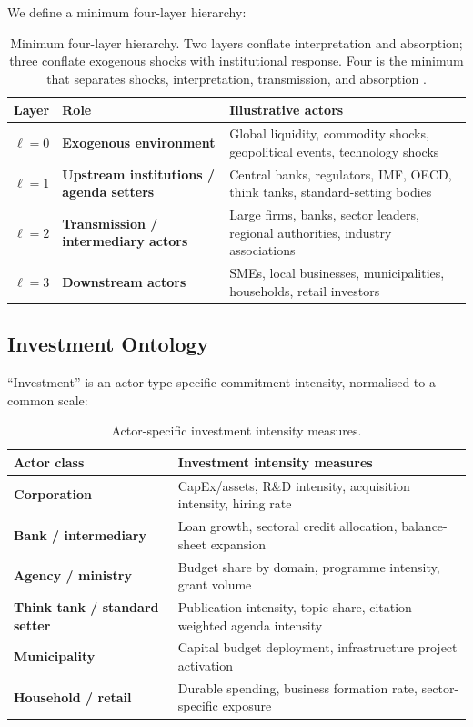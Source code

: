 \documentclass[11pt,a4paper]{article}
\theoremstyle{definition}
\begin{document}
We define a minimum four-layer hierarchy:
\begin{table}[H]
\centering\small
\begin{tabularx}{\textwidth}{@{}>{\bfseries}p{}>{\bfseries}p{}X@{}}
\toprule
Layer & Role & Illustrative actors \\
\midrule
$\ell=0$ & Exogenous environment & Global liquidity, commodity shocks, geopolitical events, technology shocks \\
$\ell=1$ & Upstream institutions / agenda setters & Central banks, regulators, IMF, OECD, think tanks, standard-setting bodies \\
$\ell=2$ & Transmission / intermediary actors & Large firms, banks, sector leaders, regional authorities, industry associations \\
$\ell=3$ & Downstream actors & SMEs, local businesses, municipalities, households, retail investors \\
\bottomrule
\end{tabularx}
\caption{Minimum four-layer hierarchy. Two layers conflate interpretation and absorption; three conflate exogenous shocks with institutional response. Four is the minimum that separates shocks, interpretation, transmission, and absorption \citep{acemoglu2015systemic}.}
\label{tab:layers}
\end{table}

\subsection{Investment Ontology}
``Investment'' is an actor-type-specific commitment intensity, normalised to a common scale:
\begin{table}[H]
\centering\small
\begin{tabularx}{\textwidth}{@{}>{\bfseries}p{}X@{}}
\toprule
Actor class & Investment intensity measures \\
\midrule
Corporation & CapEx/assets, R\&D intensity, acquisition intensity, hiring rate \\
Bank / intermediary & Loan growth, sectoral credit allocation, balance-sheet expansion \\
Agency / ministry & Budget share by domain, programme intensity, grant volume \\
Think tank / standard setter & Publication intensity, topic share, citation-weighted agenda intensity \\
Municipality & Capital budget deployment, infrastructure project activation \\
Household / retail & Durable spending, business formation rate, sector-specific exposure \\
\bottomrule
\end{tabularx}
\caption{Actor-specific investment intensity measures.}
\label{tab:investment}
\end{table}
\end{document}
